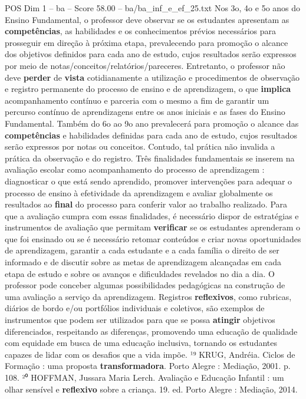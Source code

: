 \begin{textsample}{POS Dim 1 – ba – Score 58.00 – ba/ba\_inf\_e\_ef\_25.txt}
Nos 3o, 4o e 5o anos do Ensino Fundamental, o professor deve observar se os estudantes apresentam as \textbf{competências}, as habilidades e os conhecimentos prévios necessários para prosseguir em direção à próxima etapa, prevalecendo para promoção o alcance dos objetivos definidos para cada ano de estudo, cujos resultados serão expressos por meio de notas/conceitos/relatórios/pareceres.
Entretanto, o professor não deve \textbf{perder} de \textbf{vista} cotidianamente a utilização e procedimentos de observação e registro permanente do processo de ensino e de aprendizagem, o que \textbf{implica} acompanhamento contínuo e parceria com o mesmo a fim de garantir um percurso contínuo de aprendizagens entre os anos iniciais e as fases do Ensino Fundamental.
Também do 6o ao 9o ano prevalecerá para promoção o alcance das \textbf{competências} e habilidades definidas para cada ano de estudo, cujos resultados serão expressos por notas ou conceitos.
Contudo, tal prática não invalida a prática da observação e do registro.
Três finalidades fundamentais se inserem na avaliação escolar como acompanhamento do processo de aprendizagem : diagnosticar o que está sendo aprendido, promover intervenções para adequar o processo de ensino à efetividade da aprendizagem e avaliar globalmente os resultados ao \textbf{final} do processo para conferir valor ao trabalho realizado.
Para que a avaliação cumpra com essas finalidades, é necessário dispor de estratégias e instrumentos de avaliação que permitam \textbf{verificar} se os estudantes aprenderam o que foi ensinado ou se é necessário retomar conteúdos e criar novas oportunidades de aprendizagem, garantir a cada estudante e a cada família o direito de ser informado e de discutir sobre as metas de aprendizagem alcançadas em cada etapa de estudo e sobre os avanços e dificuldades revelados no dia a dia.
O professor pode conceber algumas possibilidades pedagógicas na construção de uma avaliação a serviço da aprendizagem.
Registros \textbf{reflexivos}, como rubricas, diários de bordo e/ou portfólios individuais e coletivos, são exemplos de instrumentos que podem ser utilizados para que se possa \textbf{atingir} objetivos diferenciados, respeitando as diferenças, promovendo uma educação de qualidade com equidade em busca de uma educação inclusiva, tornando os estudantes capazes de lidar com os desafios que a vida impõe. ¹⁹ KRUG, Andréia.
Ciclos de Formação : uma proposta \textbf{transformadora}.
Porto Alegre : Mediação, 2001. p. 108. ²⁰ HOFFMAN, Jussara Maria Lerch.
Avaliação e Educação Infantil : um olhar sensível e \textbf{reflexivo} sobre a criança. 19. ed.
Porto Alegre : Mediação, 2014.


\end{textsample}
